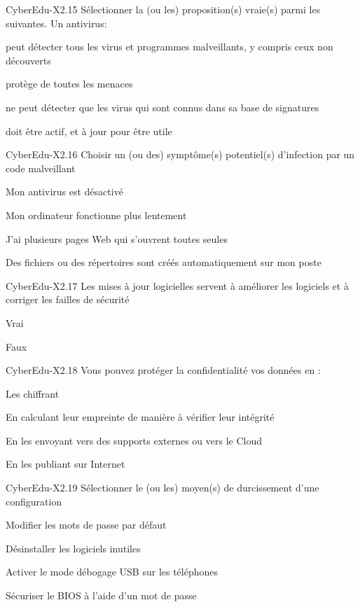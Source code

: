 \begin{multi}[multiple=true]{CyberEdu-X2.15}
	Sélectionner la (ou les) proposition(s) vraie(s) parmi les suivantes. Un antivirus:
\item peut détecter tous les virus et programmes malveillants, y compris ceux non découverts
\item protège de toutes les menaces
\item* ne peut détecter que les virus qui sont connus dans sa base de signatures
\item* doit être actif, et à jour pour être utile
\end{multi}

\begin{multi}[multiple=true]{CyberEdu-X2.16}
	Choisir un (ou des) symptôme(s) potentiel(s) d'infection par un code malveillant
\item* Mon antivirus est désactivé
\item* Mon ordinateur fonctionne plus lentement
\item  J'ai plusieurs pages Web  qui s'ouvrent toutes seules
\item Des fichiers ou des répertoires sont créés automatiquement sur mon poste
\end{multi}

\begin{multi}[multiple=true]{CyberEdu-X2.17}
	Les mises à jour logicielles servent à améliorer les logiciels et à corriger les failles de sécurité
\item* Vrai
\item Faux
\end{multi}

\begin{multi}[multiple=true]{CyberEdu-X2.18}
	Vous pouvez protéger la confidentialité vos données en :
\item* Les chiffrant
\item En calculant leur empreinte de manière à vérifier leur intégrité
\item En les envoyant vers des supports externes ou vers le Cloud
\item En  les publiant sur Internet
\end{multi}

\begin{multi}[multiple=true]{CyberEdu-X2.19}
	Sélectionner le (ou les) moyen(s) de durcissement d'une configuration
\item* Modifier les mots de passe par défaut
\item* Désinstaller les logiciels inutiles
\item Activer le mode  débogage USB  sur les téléphones
\item* Sécuriser le BIOS à l'aide d'un mot de passe
\end{multi}

